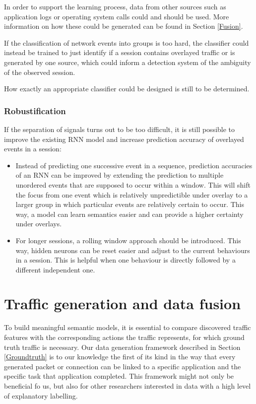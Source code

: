 \documentclass[a4paper,12pt,twoside]{report}
\begin{document}
In order to support the learning process, data from other sources such as application logs or operating system calls could and should be used. More information on how these could be generated can be found in Section \ref{Fusion}. 

If the classification of network events into groups is too hard, the classifier could instead be trained to just identify if a session contains overlayed traffic or is generated by one source, which could inform a detection system of the ambiguity of the observed session. 

How exactly an appropriate classifier could be designed is still to be determined. 



\subsubsection{Robustification}

If the separation of signals turns out to be too difficult, it is still possible to improve the existing RNN model and increase prediction accuracy of overlayed events in a session:

\begin{itemize}
\item Instead of predicting one successive event in a sequence, prediction accuracies of an RNN can be improved by extending the prediction to multiple unordered events that are supposed to occur within a window. This will shift the focus from one event which is relatively unpredictible under overlay to a larger group in which particular events are relatively certain to occur. This way, a model can learn semantics easier and can provide a higher certainty under overlays.
\item  For longer sessions, a rolling window approach should be introduced. This way, hidden neurons can be reset easier and adjust to the current behaviours in a session. This is helpful when one behaviour is directly followed by a different independent one.
\end{itemize}





\section{Traffic generation and data fusion}

To build meaningful semantic models, it is essential to compare discovered traffic features with the corresponding actions the traffic represents, for which ground truth traffic is necessary. Our data generation framework described in Section \ref{Groundtruth} is to our knowledge the first of its kind in the way that every generated packet or connection can be linked to a specific application and the specific task that application completed. This framework might not only be beneficial fo us, but also for other researchers interested in data with a high level of explanatory labelling.
\end{document}
